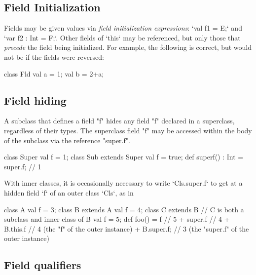 \subsection{Field Initialization}

Fields may be given values via {\em field initialization expressions}:
\xcd`val f1 = E;` and \xcd`var f2 : Int = F;`. Other fields of \xcd`this` may
be referenced, but only those that {\em precede} the field being initialized.
For example, the following is correct, but would not be if the fields were
reversed:

\begin{xten}
class Fld{
  val a = 1;
  val b = 2+a;
}
\end{xten}
%


\subsection{Field hiding}

A subclass that defines a field \xcd"f" hides any field \xcd"f"
declared in a superclass, regardless of their types.  The
superclass field \xcd"f" may be accessed within the body of
the subclass via the reference \xcd"super.f".

\begin{xten}
class Super{ 
  val f = 1; 
}
class Sub extends Super {
  val f = true;
  def superf() : Int = super.f; // 1
}
\end{xten}
%

With inner classes, it is occasionally necessary to 
write \xcd`Cls.super.f` to get at a hidden field \xcd`f` of an outer class
\xcd`Cls`, as in 
\begin{xten}
class A {
   val f = 3;
}
class B extends A {
   val f = 4;
   class C extends B {
      // C is both a subclass and inner class of B
      val f = 5;
      def foo()
         = f          // 5
         + super.f    // 4
         + B.this.f   // 4 (the "f" of the outer instance)
         + B.super.f; // 3 (the "super.f" of the outer instance)
    }
}
\end{xten}
%


\subsection{Field qualifiers}
\label{FieldQualifier}

